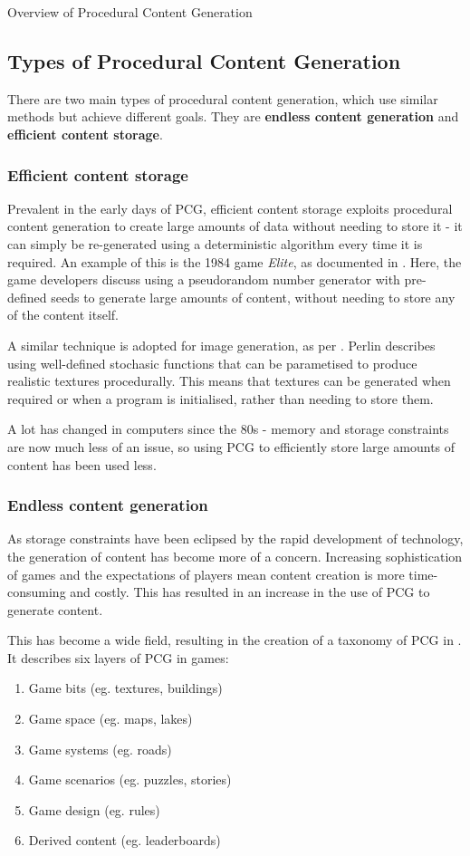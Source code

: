 \documentclass[review]{cmpreport}
\begin{document}
\begin{section}{Overview of Procedural Content Generation}
\subsection{Types of Procedural Content Generation}
There are two main types of procedural content generation, which use similar methods but achieve different goals. They are \textbf{endless content generation} and \textbf{efficient content storage}.

\subsubsection{Efficient content storage}
Prevalent in the early days of PCG, efficient content storage exploits procedural content generation to create large amounts of data without needing to store it - it can simply be re-generated using a deterministic algorithm every time it is required. An example of this is the 1984 game \textit{Elite}, as documented in \citet{spufford_2003}. Here, the game developers discuss using a pseudorandom number generator with pre-defined seeds to generate large amounts of content, without needing to store any of the content itself. \par
A similar technique is adopted for image generation, as per \cite{Perlin:1985:IS:325165.325247}. Perlin describes using well-defined stochasic functions that can be parametised to produce realistic textures procedurally. This means that textures can be generated when required or when a program is initialised, rather than needing to store them. \par
A lot has changed in computers since the 80s - memory and storage constraints are now much less of an issue, so using PCG to efficiently store large amounts of content has been used less.

\subsubsection{Endless content generation}
As storage constraints have been eclipsed by the rapid development of technology, the generation of content has become more of a concern. Increasing sophistication of games and the expectations of players mean content creation is more time-consuming and costly. This has resulted in an increase in the use of PCG to generate content. \par
This has become a wide field, resulting in the creation of a taxonomy of PCG in \cite{Hendrikx:2013:PCG:2422956.2422957}. It describes six layers of PCG in games:
\begin{enumerate}
    \item Game bits (eg. textures, buildings)
    \item Game space (eg. maps, lakes)
    \item Game systems (eg. roads)
    \item Game scenarios (eg. puzzles, stories)
    \item Game design (eg. rules)
    \item Derived content (eg. leaderboards)
\end{enumerate}


\end{section}
\end{document}
